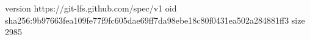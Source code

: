 version https://git-lfs.github.com/spec/v1
oid sha256:9b97663fea109fe77f9fc605dae69ff7da98ebe18c80f0431ea502a284881ff3
size 2985
